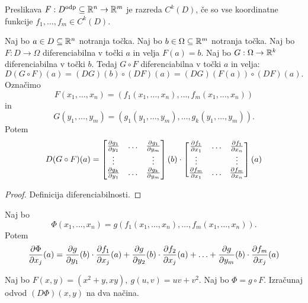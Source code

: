 \begin{definicija}
    Preslikava $F: D^{\text{odp}} \subseteq \mathbb{R}^n \to \mathbb{R}^m$ je razreda $C^k(D)$, če so vse koordinatne funkcije $f_1, \ldots, f_m \in C^k(D)$.
\end{definicija}

\begin{izrek}
    Naj bo $a \in D \subseteq \mathbb{R}^n$ notranja točka. Naj bo $b \in \Omega \subseteq \mathbb{R}^m$ notranja točka. Naj bo $F: D \to \Omega$ diferenciabilna v točki $a$ in velja $F(a) = b$. Naj bo $G: \Omega \to \mathbb{R}^k$ diferenciabilna v točki $b$. Tedaj $G \circ F$ diferenciabilna v točki $a$ in velja:
    $$D(G \circ F)(a) = (DG)(b) \circ (DF)(a) = (DG)(F(a)) \circ (DF)(a).$$
    Označimo $$F(x_1, \ldots, x_n) = (f_1(x_1, \ldots, x_n), \ldots, f_m(x_1, \ldots, x_n))$$ in $$G(y_1, \ldots, y_m) = (g_1(y_1, \ldots, y_m), \ldots, g_k(y_1, \ldots, y_m)).$$ Potem 
    $$D(G \circ F)(a) = \begin{bmatrix}
        \frac{\partial g_1}{\partial y_1} & \ldots & \frac{\partial g_1}{\partial y_m} \\
        \vdots & & \vdots \\
        \frac{\partial g_k}{\partial y_1} & \ldots & \frac{\partial g_k}{\partial y_m}
    \end{bmatrix}(b) \cdot \begin{bmatrix}
        \frac{\partial f_1}{\partial x_1} & \ldots & \frac{\partial f_1}{\partial x_n} \\
        \vdots & & \vdots \\
        \frac{\partial f_m}{\partial x_1} & \ldots & \frac{\partial f_m}{\partial x_n}
    \end{bmatrix}(a)$$
\end{izrek}

\begin{proof}
    Definicija diferenciabilnosti.
\end{proof}

\begin{posledica}[$k=1$, $G = g$ funkcija]
    Naj bo $$\Phi(x_1, \ldots, x_n) = g(f_1(x_1, \ldots, x_n), \ldots, f_m(x_1, \ldots, x_n)).$$ Potem 
    $$\frac{\partial \Phi}{\partial x_j}(a) = \frac{\partial g}{\partial y_1}(b) \cdot \frac{\partial f_1}{\partial x_j}(a) + \frac{\partial g}{\partial y_2}(b) \cdot \frac{\partial f_2}{\partial x_j}(a) + \ldots + \frac{\partial g}{\partial y_m}(b) \cdot \frac{\partial f_m}{\partial x_j}(a)$$
\end{posledica}

\begin{zgled}
    Naj bo $F(x,y) = (x^2 + y, xy), \ g(u, v) = uv + v^2$. Naj bo $\Phi = g \circ F$. Izračunaj odvod $(D\Phi)(x,y)$ na dva načina.
\end{zgled}

